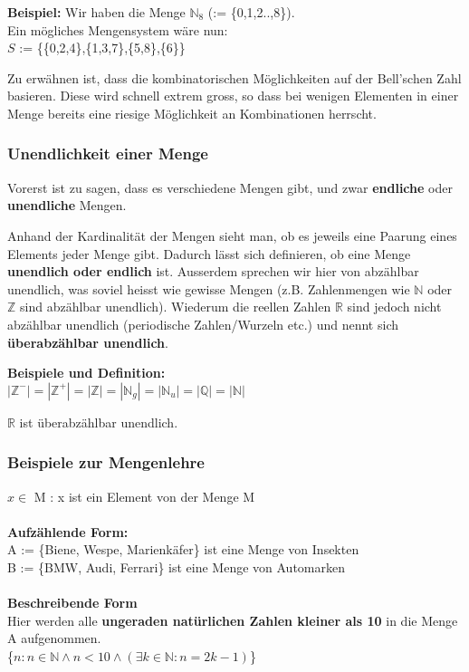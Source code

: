 \documentclass[a4paper,12pt]{article}
\begin{document}
\textbf{Beispiel:} Wir haben die Menge $\mathbb{N}_8$ (:= \{0,1,2..,8\}). \\
Ein mögliches Mengensystem wäre nun: \\
$S$ := \{\{0,2,4\},\{1,3,7\},\{5,8\},\{6\}\}

Zu erwähnen ist, dass die kombinatorischen Möglichkeiten auf der Bell'schen Zahl basieren. Diese wird schnell extrem gross, so dass bei wenigen Elementen in einer Menge bereits eine riesige Möglichkeit an Kombinationen herrscht.

\subsubsection{Unendlichkeit einer Menge}
Vorerst ist zu sagen, dass es verschiedene Mengen gibt, und zwar \textbf{endliche} oder \textbf{unendliche} Mengen.

Anhand der Kardinalität der Mengen sieht man, ob es jeweils eine Paarung eines Elements jeder Menge gibt. Dadurch lässt sich definieren, ob eine Menge \textbf{unendlich oder endlich} ist. Ausserdem sprechen wir hier von abzählbar unendlich, was soviel heisst wie gewisse Mengen (z.B. Zahlenmengen wie $\mathbb{N}$ oder $\mathbb{Z}$ sind abzählbar unendlich). Wiederum die reellen Zahlen $\mathbb{R}$ sind jedoch nicht abzählbar unendlich (periodische Zahlen/Wurzeln etc.) und nennt sich \textbf{überabzählbar unendlich}.

\textbf{Beispiele und Definition:} \\
$|\mathbb{Z}^{-}| = |\mathbb{Z}^{+}| = |\mathbb{Z}| = |\mathbb{N}_g| = |\mathbb{N}_u| = |\mathbb{Q}| = |\mathbb{N}|$

$\mathbb{R}$ ist überabzählbar unendlich.


\subsubsection*{Beispiele zur Mengenlehre}
$x \in $ M : x ist ein Element von der Menge M \\
\\
\textbf{Aufzählende Form:} \\
A := \{Biene, Wespe, Marienkäfer\} ist eine Menge von Insekten \\
B := \{BMW, Audi, Ferrari\} ist eine Menge von Automarken \\
\\
\textbf{Beschreibende Form} \\
Hier werden alle \textbf{ungeraden natürlichen Zahlen kleiner als 10} in die Menge A aufgenommen. \\
\{\(n : n \in \mathbb{N} \land n < 10 \land (\exists k \in \mathbb{N} : n = 2k -1)\)\} \\
\end{document}
